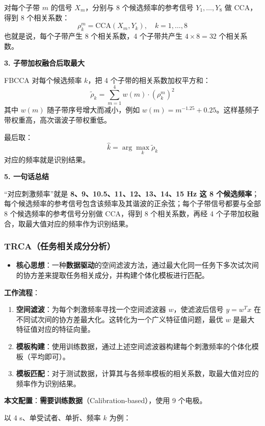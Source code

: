 \documentclass[12pt, a4paper]{ctexart}
\begin{document}
对每个子带 $m$ 的信号 $X_m$，分别与 8 个候选频率的参考信号 $Y_1,\dots,Y_8$ 做 CCA，得到 8 个相关系数：
\[
\rho_{k}^{m} = \text{CCA}(X_m, Y_k), \quad k=1,\dots,8
\]
也就是说，每个子带产生 8 个相关系数，4 个子带共产生 $4 \times 8 = 32$ 个相关系数。

\textbf{3. 子带加权融合后取最大}

FBCCA 对每个候选频率 $k$，把 4 个子带的相关系数加权平方和：
\[
\tilde{\rho}_k = \sum_{m=1}^{4} w(m) \cdot (\rho_k^m)^2
\]
其中 $w(m)$ 随子带序号增大而减小，例如 $w(m)=m^{-1.25}+0.25$。这样基频子带权重高，高次谐波子带权重低。

最后取：
\[
\hat{k} = \arg\max_k \tilde{\rho}_k
\]
对应的频率就是识别结果。

\textbf{5. 一句话总结}

``对应刺激频率''就是 \textbf{8、9、10.5、11、12、13、14、15 Hz 这 8 个候选频率}；每个候选频率的参考信号包含该频率及其谐波的正余弦；每个子带信号都要与全部 8 个候选频率的参考信号分别做 CCA，得到 8 个相关系数，再经 4 个子带加权融合，取最大值对应的频率作为识别结果。

\subsubsection*{TRCA（任务相关成分分析）}

\begin{itemize}
  \item \textbf{核心思想}：一种\textbf{数据驱动}的空间滤波方法，通过最大化同一任务下多次试次间的协方差来提取任务相关成分，并构建个体化模板进行匹配。
\end{itemize}

\textbf{工作流程}：

\begin{enumerate}
  \item \textbf{空间滤波}：为每个刺激频率寻找一个空间滤波器 $w$，使滤波后信号 $y = w^T x$ 在不同试次间的协方差最大化。这转化为一个广义特征值问题，最优 $w$ 是最大特征值对应的特征向量。
  \item \textbf{模板构建}：使用训练数据，通过上述空间滤波器构建每个刺激频率的个体化模板（平均即可）。
  \item \textbf{模板匹配}：对于测试数据，计算其与各频率模板的相关系数，取最大值对应的频率作为识别结果。
\end{enumerate}

\textbf{本文配置}：\textbf{需要训练数据}（Calibration-based），使用 9 个电极。

以 4 s、单受试者、单折、频率 $k$ 为例：
\end{document}
